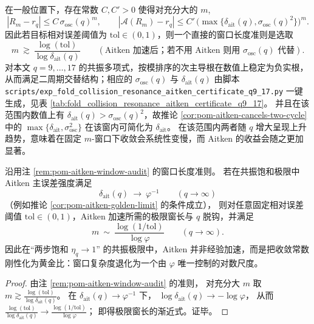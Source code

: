 \begin{remark}\label{rem:pom-aitken-window-audit}
在一般位置下，存在常数 \(C,C'>0\) 使得对充分大的 \(m\),
\[
\left|R_m-r_q\right|\le C\,\sigma_{\mathrm{osc}}(q)^{m},
\qquad
\left|\mathcal{A}(R_m)-r_q\right|\le C'\,\bigl(\max\{\delta_{\mathrm{ait}}(q),\sigma_{\mathrm{osc}}(q)^2\}\bigr)^{m}.
\]
因此若目标相对误差阈值为 \(\mathrm{tol}\in(0,1)\)，则一个直接的窗口长度准则是选取
\[
m\ \gtrsim\ \frac{\log(\mathrm{tol})}{\log \delta_{\mathrm{ait}}(q)}
\qquad(\text{Aitken 加速后；若不用 Aitken 则用 }\sigma_{\mathrm{osc}}(q)\text{ 代替}).
\]
对本文 \(q=9,\dots,17\) 的共振多项式，按模排序的次主导根在数值上稳定为负实根，从而满足二周期交替结构；相应的 \(\sigma_{\mathrm{osc}}(q)\) 与 \(\delta_{\mathrm{ait}}(q)\) 由脚本 \texttt{scripts/exp\_fold\_collision\_resonance\_aitken\_certificate\_q9\_17.py} 一键生成，见表 \ref{tab:fold_collision_resonance_aitken_certificate_q9_17}。
并且在该范围内数值上有 \(\delta_{\mathrm{ait}}(q)>\sigma_{\mathrm{osc}}(q)^2\)，故推论 \ref{cor:pom-aitken-cancels-two-cycle} 中的 \(\max\{\delta_{\mathrm{ait}},\sigma_{\mathrm{osc}}^2\}\) 在该窗内可简化为 \(\delta_{\mathrm{ait}}\)。
在该范围内两者随 \(q\) 增大呈现上升趋势，意味着在固定 \(m\)-窗口下收敛会系统性变慢，而 Aitken 的收益会随之更加显著。
\end{remark}

\begin{corollary}\label{cor:pom-aitken-window-golden-invariance}
沿用注 \ref{rem:pom-aitken-window-audit} 的窗口长度准则。
若在共振饱和极限中 Aitken 主误差强度满足
\[
\delta_{\mathrm{ait}}(q)\ \longrightarrow\ \varphi^{-1}
\qquad(q\to\infty)
\]
（例如推论 \ref{cor:pom-aitken-golden-limit} 的条件成立），
则对任意固定相对误差阈值 \(\mathrm{tol}\in(0,1)\)，Aitken 加速所需的极限窗长与 \(q\) 脱钩，并满足
\[
m\ \sim\ \frac{\log(1/\mathrm{tol})}{\log\varphi}
\qquad(q\to\infty).
\]
因此在“两步饱和 \(\eta_q\to 1\)” 的共振极限中，Aitken 并非经验加速，而是把收敛常数刚性化为黄金比：窗口复杂度退化为一个由 \(\varphi\) 唯一控制的对数尺度。
\end{corollary}
\begin{proof}
由注 \ref{rem:pom-aitken-window-audit} 的准则，
对充分大 \(m\) 取
\(
m\gtrsim \frac{\log(\mathrm{tol})}{\log\delta_{\mathrm{ait}}(q)}
\)。
在 \(\delta_{\mathrm{ait}}(q)\to\varphi^{-1}\) 下，
\(
\log\delta_{\mathrm{ait}}(q)\to -\log\varphi
\)，
从而
\(
\frac{\log(\mathrm{tol})}{\log\delta_{\mathrm{ait}}(q)}\to \frac{\log(1/\mathrm{tol})}{\log\varphi}
\)；
即得极限窗长的渐近式。证毕。
\end{proof}


